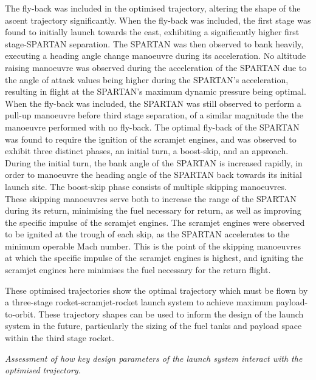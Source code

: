 	The fly-back was included in the optimised trajectory, altering the shape of the ascent trajectory significantly. When the fly-back was included, the first stage was found to initially launch towards the east, exhibiting a significantly higher first stage-SPARTAN separation. The SPARTAN was then observed to bank heavily, executing a heading angle change manoeuvre during its acceleration. No altitude raising manoeuvre was observed during the acceleration of the SPARTAN due to the angle of attack values being higher during the SPARTAN's acceleration, resulting in flight at the SPARTAN's maximum dynamic pressure being optimal. 
When the fly-back was included, the SPARTAN was still observed to perform a pull-up manoeuvre before third stage separation, of a similar magnitude the the manoeuvre performed with no fly-back. 
The optimal fly-back of the SPARTAN was found to require the ignition of the scramjet engines, and was observed to exhibit three distinct phases, an initial turn, a boost-skip, and an approach. 
During the initial turn, the bank angle of the SPARTAN is increased rapidly, in order to manoeuvre the heading angle of the SPARTAN back towards its initial launch site. 
The boost-skip phase consists of multiple skipping manoeuvres. These skipping manoeuvres serve both to increase the range of the SPARTAN during its return, minimising the fuel necessary for return, as well as improving the specific impulse of the scramjet engines.
 The scramjet engines were observed to be ignited at the trough of each skip, as the SPARTAN accelerates to the minimum operable Mach number. This is the point of the skipping manoeuvres at which the specific impulse of the scramjet engines is highest, and igniting the scramjet engines here minimises the fuel necessary for the return flight. 
	
	These optimised trajectories show the optimal trajectory which must be flown by a three-stage rocket-scramjet-rocket launch system to achieve maximum payload-to-orbit. These trajectory shapes can be used to inform the design of the launch system in the future, particularly the sizing of the fuel tanks and payload space within the third stage rocket.  
	
	\emph{Assessment of how key design parameters of the launch system interact with the optimised trajectory.}
	
